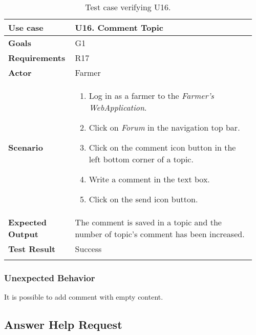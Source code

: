 \begin{longtable}{@{}p{0.25\linewidth}p{0.71\linewidth}@{}}
	\toprule
	\textbf{Use case} & \textbf{U16.} Comment Topic \\
	\midrule
	\textbf{Goals} & G1\\
	\midrule
	\textbf{Requirements} & R17\\
	\midrule
	\textbf{Actor} & Farmer\\
	\midrule
	\textbf{Scenario} & \begin{enumerate}[leftmargin=.4cm,noitemsep,topsep=0pt,before=\vspace{-3mm},after=\vspace{-4mm}]
		\item Log in as a farmer to the \textit{Farmer's WebApplication}.
		\item Click on \textit{Forum} in the navigation top bar.
		\item Click on the comment icon button in the left bottom corner of a topic.
		\item Write a comment in the text box.
		\item Click on the send icon button.
	\end{enumerate}\\
	\midrule
	\textbf{Expected Output} & The comment is saved in a topic and the number of topic's comment has been increased.\\
	\midrule
	\textbf{Test Result} & Success\\
	\bottomrule
	\caption{Test case verifying U16.}
\end{longtable}


\subsubsection*{Unexpected Behavior}
It is possible to add comment with empty content.

\subsection{Answer Help Request}

